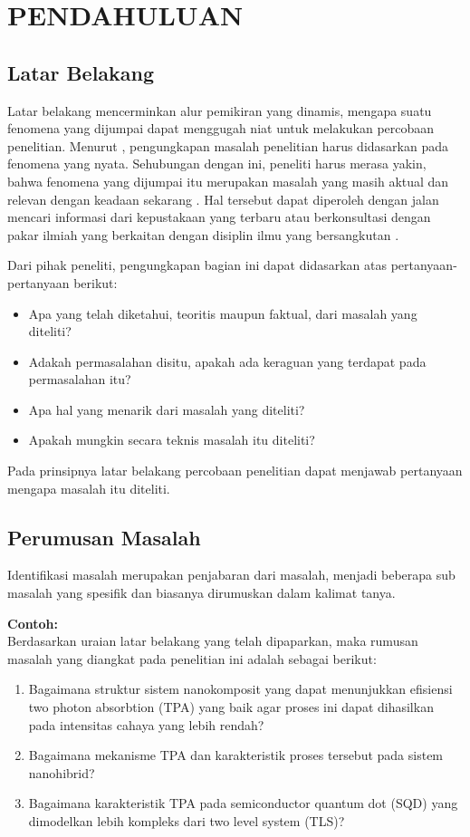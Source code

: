 \chapter{PENDAHULUAN}

\section{Latar Belakang}
Latar belakang mencerminkan alur pemikiran yang dinamis, mengapa suatu fenomena yang dijumpai dapat menggugah niat untuk melakukan percobaan penelitian. Menurut \textcite{dewi2022}, pengungkapan masalah penelitian harus didasarkan pada fenomena yang nyata. Sehubungan dengan ini, peneliti harus merasa yakin, bahwa fenomena yang dijumpai itu merupakan masalah yang masih aktual dan relevan dengan keadaan sekarang \parencite{farhati2022}. Hal tersebut dapat diperoleh dengan jalan mencari informasi dari kepustakaan yang terbaru atau berkonsultasi dengan pakar ilmiah yang berkaitan dengan disiplin ilmu yang bersangkutan \parencite{mallios2010}.

Dari pihak peneliti, pengungkapan bagian ini dapat didasarkan atas pertanyaan-pertanyaan berikut:
\begin{itemize}
    \item Apa yang telah diketahui, teoritis maupun faktual, dari masalah yang diteliti?
    \item Adakah permasalahan disitu, apakah ada keraguan yang terdapat pada permasalahan itu?
    \item Apa hal yang menarik dari masalah yang diteliti?
    \item Apakah mungkin secara teknis masalah itu diteliti?
\end{itemize}
Pada prinsipnya latar belakang percobaan penelitian dapat menjawab pertanyaan mengapa masalah itu diteliti.

\section{Perumusan Masalah}
Identifikasi masalah merupakan penjabaran dari masalah, menjadi beberapa sub masalah yang spesifik dan biasanya dirumuskan dalam kalimat tanya.

\textbf{Contoh:} \\
Berdasarkan uraian latar belakang yang telah dipaparkan, maka rumusan masalah yang diangkat pada penelitian ini adalah sebagai berikut:
\begin{enumerate}
    \item Bagaimana struktur sistem nanokomposit yang dapat menunjukkan efisiensi two photon absorbtion (TPA) yang baik agar proses ini dapat dihasilkan pada intensitas cahaya yang lebih rendah?
    \item Bagaimana mekanisme TPA dan karakteristik proses tersebut pada sistem nanohibrid?
    \item Bagaimana karakteristik TPA pada semiconductor quantum dot (SQD) yang dimodelkan lebih kompleks dari two level system (TLS)?
\end{enumerate}

